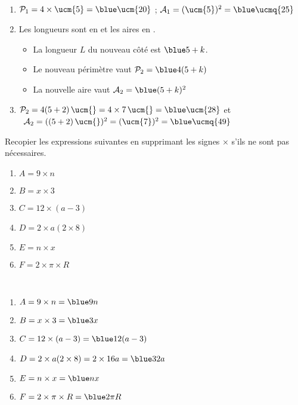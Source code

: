 \begin{colonne*exercice}
\begin{corrige}
   \ \\ [-5mm]
   \begin{enumerate}
      \item $\mathcal{P}_1 =4\times\ucm{5} =\blue\ucm{20}$ ; $\mathcal{A}_1 =(\ucm{5})^2 =\blue\ucmq{25}$
      \item Les longueurs sont en \ucm{} et les aires en \ucmq{}.
      \begin{itemize}
         \item La longueur $L$ du nouveau côté est $\blue5+k$.
         \item Le nouveau périmètre vaut $\mathcal{P}_2 =\blue4(5+k)$
         \item La nouvelle aire vaut $\mathcal{A}_2 =\blue(5+k)^2$
      \end{itemize}
      \item $\mathcal{P}_2 =4(5+2) \, \ucm{} = 4\times7 \, \ucm{} =\blue\ucm{28}$ et \\
      \quad\, $\mathcal{A}_2 =((5+2)\,\ucm{})^2 =(\ucm{7})^2 =\blue\ucmq{49}$
   \end{enumerate}
\end{corrige}

\bigskip


\begin{exercice} %
Recopier les expressions suivantes en supprimant les signes $\times$ s'ils ne sont pas nécessaires.
\begin{enumerate}
   \item $A =9\times n$
   \item $B =x\times3$
   \item $C =12\times(a-3)$
   \item $D =2\times a(2\times8)$
   \item $E =n\times x$
   \item $F =2\times\pi\times R$
\end{enumerate}
\end{exercice}

\begin{corrige}
   \ \\ [-5mm]
   \begin{enumerate}
      \item $A =9\times n =\blue9n$
      \item $B =x\times3 =\blue3x$
      \item $C =12\times(a-3) =\blue12(a-3)$
      \item $D =2\times a(2\times8) =2\times16a =\blue32a$
      \item $E =n\times x =\blue nx$
      \item $F =2\times\pi\times R =\blue2\pi R$
\end{enumerate}
\end{corrige}


\end{colonne*exercice}
